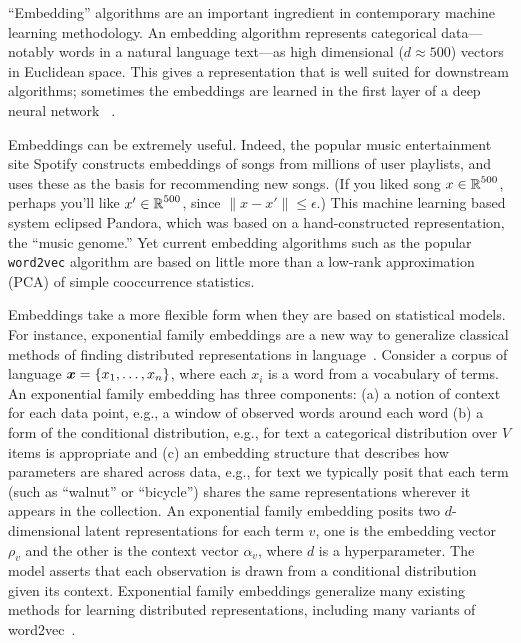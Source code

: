 \statbackground{}
``Embedding'' algorithms are an important ingredient in contemporary
machine learning methodology. An embedding algorithm represents 
categorical data---notably words in a natural language text---as
high dimensional ($d\approx 500$) vectors in Euclidean space. 
This gives a representation that is well suited for downstream
algorithms; sometimes the embeddings are learned in the first layer of
a deep neural network ~\citep{Bengio:2003,Mikolov:2013}.  

Embeddings can be extremely useful. Indeed, the popular music
entertainment site Spotify constructs embeddings of songs from
millions of user playlists, and uses these as the basis for
recommending new songs.  (If you liked song $x\in\mbox{$\mathbb{R}$}^{500}$,
perhaps you'll like $x'\in\mbox{$\mathbb{R}$}^{500}$, since
$\|x-x'\|\leq \epsilon$.) This machine learning based
system eclipsed Pandora, which was based on a hand-constructed
representation, the ``music genome.'' Yet current embedding
algorithms such as the popular \texttt{word2vec} algorithm 
are based on little more than a low-rank approximation
(PCA) of simple cooccurrence statistics. 

Embeddings take a more flexible form when they are based
on statistical models. For instance, exponential family embeddings are a new way to
generalize classical methods of finding distributed representations in
language~\citep{Rudolph:2016b}.
Consider a corpus of language $\boldsymbol{x} = \{x_1, \ldots, x_n\}$, where
each $x_i$ is a word from a vocabulary of terms. An exponential family
embedding has three components: (a) a notion of context for
each data point, e.g., a window of observed words around each word (b)
a form of the conditional distribution, e.g., for text a
categorical distribution over $V$ items is appropriate and (c) an
embedding structure that describes how parameters are shared
across data, e.g., for text we typically posit that each term (such as
``walnut'' or ``bicycle'') shares the same representations wherever it
appears in the collection.
An exponential family embedding
posits two $d$-dimensional latent representations for each term $v$,
one is the embedding vector $\rho_v$ and the other is the
context vector $\alpha_v$, where $d$ is a hyperparameter.  The
model asserts that each observation is drawn from a conditional
distribution given its context. 
Exponential family embeddings generalize many existing methods for
learning distributed representations, including 
many variants of word2vec~\citep{Bengio:2003,Mikolov:2013}.  


